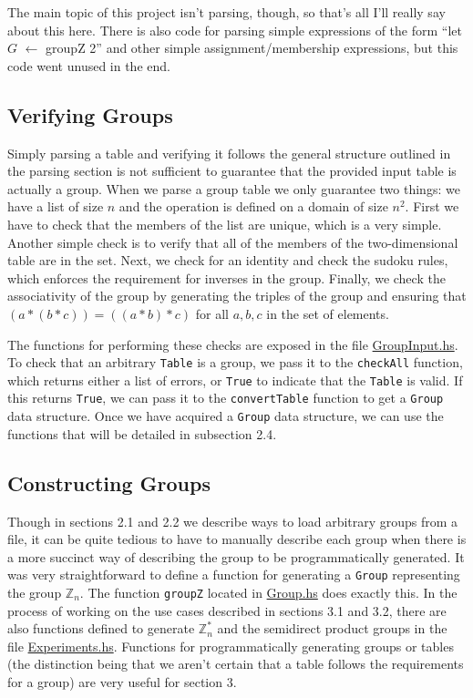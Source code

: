 \documentclass[11pt,a4paper]{article}
\theoremstyle{definition}
\begin{document}
The main topic of this project isn't parsing, though, so that's all I'll really say about this here. There is also code for parsing simple expressions of the form ``let $G$ $\gets$ groupZ 2'' and other simple assignment/membership expressions, but this code went unused in the end.

\subsection{Verifying Groups}

Simply parsing a table and verifying it follows the general structure outlined in the parsing section is not sufficient to guarantee that the provided input table is actually a group. When we parse a group table we only guarantee two things: we have a list of size $n$ and the operation is defined on a domain of size $n^2$. First we have to check that the members of the list are unique, which is a very simple. Another simple check is to verify that all of the members of the two-dimensional table are in the set. Next, we check for an identity and check the sudoku rules, which enforces the requirement for inverses in the group. Finally, we check the associativity of the group by generating the triples of the group and ensuring that $(a \ast (b \ast c)) = ((a \ast b) \ast c)$ for all $a, b, c$ in the set of elements.

The functions for performing these checks are exposed in the file \href{https://github.com/gr-a-m/GrCal/blob/master/src/GrCal/GroupInput.hs}{GroupInput.hs}. To check that an arbitrary \texttt{Table} is a group, we pass it to the \texttt{checkAll} function, which returns either a list of errors, or \texttt{True} to indicate that the \texttt{Table} is valid. If this returns \texttt{True}, we can pass it to the \texttt{convertTable} function to get a \texttt{Group} data structure. Once we have acquired a \texttt{Group} data structure, we can use the functions that will be detailed in subsection 2.4.

\subsection{Constructing Groups}

Though in sections 2.1 and 2.2 we describe ways to load arbitrary groups from a file, it can be quite tedious to have to manually describe each group when there is a more succinct way of describing the group to be programmatically generated. It was very straightforward to define a function for generating a \texttt{Group} representing the group $\mathbb{Z}_n$. The function \texttt{groupZ} located in \href{https://github.com/gr-a-m/GrCal/blob/master/src/GrCal/Group.hs}{Group.hs} does exactly this. In the process of working on the use cases described in sections 3.1 and 3.2, there are also functions defined to generate $\mathbb{Z}_n^\ast$ and the semidirect product groups in the file \href{https://github.com/gr-a-m/GrCal/blob/master/src/GrCal/Experiments.hs}{Experiments.hs}. Functions for programmatically generating groups or tables (the distinction being that we aren't certain that a table follows the requirements for a group) are very useful for section 3.
\end{document}
